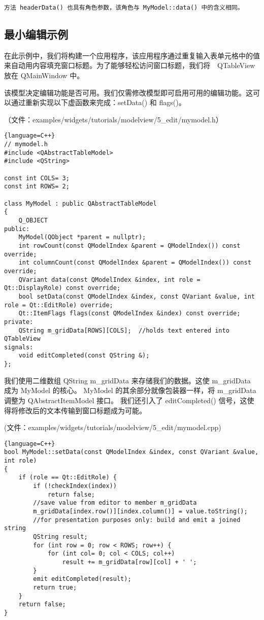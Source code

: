 \begin{lstlisting}
方法 headerData() 也具有角色参数，该角色与 MyModel::data() 中的含义相同。
\end{lstlisting}

\subsection{最小编辑示例}

在此示例中，我们将构建一个应用程序，该应用程序通过重复输入表单元格中的值来自动用内容填充窗口标题。为了能够轻松访问窗口标题，我们将　QTableView 放在 QMainWindow 中。

该模型决定编辑功能是否可用。我们仅需修改模型即可启用可用的编辑功能。这可以通过重新实现以下虚函数来完成：setData() 和 flags()。

（文件：examples/widgets/tutorials/modelview/5\_edit/mymodel.h）


\begin{lstlisting}{language=C++}
// mymodel.h
#include <QAbstractTableModel>
#include <QString>

const int COLS= 3;
const int ROWS= 2;

class MyModel : public QAbstractTableModel
{
    Q_OBJECT
public:
    MyModel(QObject *parent = nullptr);
    int rowCount(const QModelIndex &parent = QModelIndex()) const override;
    int columnCount(const QModelIndex &parent = QModelIndex()) const override;
    QVariant data(const QModelIndex &index, int role = Qt::DisplayRole) const override;
    bool setData(const QModelIndex &index, const QVariant &value, int role = Qt::EditRole) override;
    Qt::ItemFlags flags(const QModelIndex &index) const override;
private:
    QString m_gridData[ROWS][COLS];  //holds text entered into QTableView
signals:
    void editCompleted(const QString &);
};
\end{lstlisting}

我们使用二维数组 QString m\_gridData 来存储我们的数据。这使 m\_gridData 成为 MyModel 的核心。
MyModel 的其余部分就像包装器一样，将 m\_gridData 调整为 QAbstractItemModel 接口。
我们还引入了 editCompleted() 信号，这使得将修改后的文本传输到窗口标题成为可能。

(文件：examples/widgets/tutorials/modelview/5\_edit/mymodel.cpp)

\begin{lstlisting}{language=C++}
bool MyModel::setData(const QModelIndex &index, const QVariant &value, int role)
{
    if (role == Qt::EditRole) {
        if (!checkIndex(index))
            return false;
        //save value from editor to member m_gridData
        m_gridData[index.row()][index.column()] = value.toString();
        //for presentation purposes only: build and emit a joined string
        QString result;
        for (int row = 0; row < ROWS; row++) {
            for (int col= 0; col < COLS; col++)
                result += m_gridData[row][col] + ' ';
        }
        emit editCompleted(result);
        return true;
    }
    return false;
}
\end{lstlisting}
    
